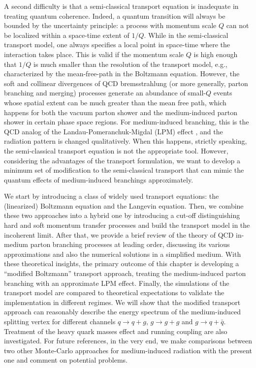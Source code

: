 A second difficulty is that a semi-classical transport equation is inadequate in treating quantum coherence.
Indeed, a quantum transition will always be bounded by the uncertainty principle: a process with momentum scale $Q$ can not be localized within a space-time extent of $1/Q$.
While in the semi-classical transport model, one always specifies a local point in space-time where the interaction takes place.
This is valid if the momentum scale $Q$ is high enough that $1/Q$ is much smaller than the resolution of the transport model, e.g., characterized by the mean-free-path in the Boltzmann equation.
However, the soft and collinear divergences of QCD bremsstrahlung (or more generally, parton branching and merging) processes generate an abundance of small-$Q$ events whose spatial extent can be much greater than the mean free path, which happens for both the vacuum parton shower and the medium-induced parton shower in certain phase space regions.
For medium-induced branching, this is the QCD analog of the Landau-Pomeranchuk-Migdal (LPM) effect \cite{PhysRev.103.1811,Wang:1994fx,Zakharov:1996fv}, and the radiation pattern is changed qualitatively.
When this happens, strictly speaking, the semi-classical transport equation is not the appropriate tool.
However, considering the advantages of the transport formulation, we want to develop a minimum set of modification to the semi-classical transport that can mimic the quantum effects of medium-induced branchings approximately.

We start by introducing a class of widely used transport equations: the (linearized) Boltzmann equation and the Langevin equation.
Then, we combine these two approaches into a hybrid one by introducing a cut-off distinguishing hard and soft momentum transfer processes and build the transport model in the incoherent limit.
After that, we provide a brief review of the theory of QCD in-medium parton branching processes at leading order, discussing its various approximations and also the numerical solutions in a simplified medium.
With these theoretical insights, the primary outcome of this chapter is developing a ``modified Boltzmann'' transport approach, treating the medium-induced parton branching with an approximate LPM effect.
Finally, the simulations of the transport model are compared to theoretical expectations to validate the implementation in different regimes.
We will show that the modified transport approach can reasonably describe the energy spectrum of the medium-induced splitting vertex for different channels $q\rightarrow q+g$, $g\rightarrow g+g$ and $g\rightarrow q+\bar{q}$.
Treatment of the heavy quark masses effect and running coupling are also investigated.
For future references, in the very end, we make comparisons between two other Monte-Carlo approaches for medium-induced radiation with the present one and comment on potential problems.


